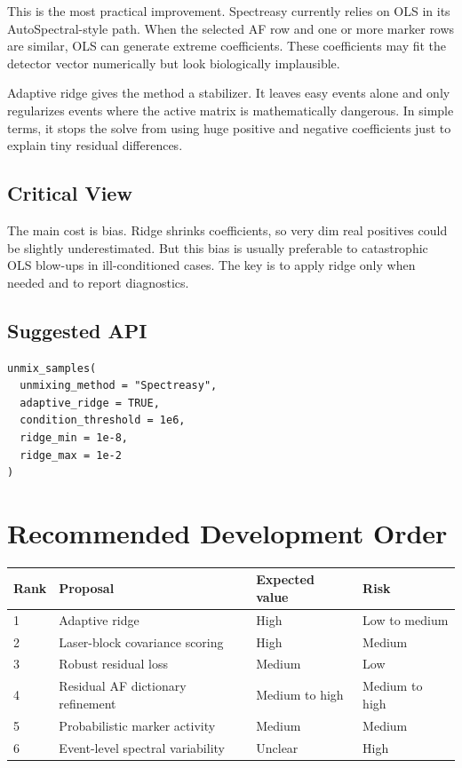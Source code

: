 \documentclass[11pt]{article}
\begin{document}
This is the most practical improvement. Spectreasy currently relies on OLS in
its AutoSpectral-style path. When the selected AF row and one or more marker
rows are similar, OLS can generate extreme coefficients. These coefficients may
fit the detector vector numerically but look biologically implausible.

Adaptive ridge gives the method a stabilizer. It leaves easy events alone and
only regularizes events where the active matrix is mathematically dangerous. In
simple terms, it stops the solve from using huge positive and negative
coefficients just to explain tiny residual differences.

\subsection*{Critical View}

The main cost is bias. Ridge shrinks coefficients, so very dim real positives
could be slightly underestimated. But this bias is usually preferable to
catastrophic OLS blow-ups in ill-conditioned cases. The key is to apply ridge
only when needed and to report diagnostics.

\subsection*{Suggested API}

\begin{verbatim}
unmix_samples(
  unmixing_method = "Spectreasy",
  adaptive_ridge = TRUE,
  condition_threshold = 1e6,
  ridge_min = 1e-8,
  ridge_max = 1e-2
)
\end{verbatim}

\section{Recommended Development Order}

\begin{table}[h!]
\centering
\begin{tabular}{@{}llll@{}}
\toprule
Rank & Proposal & Expected value & Risk \\
\midrule
1 & Adaptive ridge & High & Low to medium \\
2 & Laser-block covariance scoring & High & Medium \\
3 & Robust residual loss & Medium & Low \\
4 & Residual AF dictionary refinement & Medium to high & Medium to high \\
5 & Probabilistic marker activity & Medium & Medium \\
6 & Event-level spectral variability & Unclear & High \\
\bottomrule
\end{tabular}
\end{table}
\end{document}
